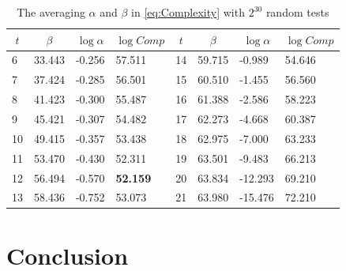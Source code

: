 \begin{table}[htbp]
  \centering
  \caption{The averaging $\alpha$ and $\beta$ in \eqref{eq:Complexity} with $2^{30}$ random tests}\label{tab:ZhangAlphaAndBetaOriginal}
    \begin{tabular}{|l|l|l|l|l|l|l|l|}
    \hline
    \multicolumn{1}{|c|}{$t$} & \multicolumn{1}{c|}{$\beta$} & \multicolumn{1}{c|}{$\log\alpha$} & \multicolumn{1}{c|}{$\log Comp$} & \multicolumn{1}{c|}{$t$} & \multicolumn{1}{c|}{$\beta$} & \multicolumn{1}{c|}{$\log\alpha$} & \multicolumn{1}{c|}{$\log Comp$} \\
    \hline

    6    & 33.443 & -0.256 & 57.511 & 14    & 59.715 & -0.989 &  54.646\\
    \hline
    7    & 37.424 & -0.285 & 56.501 & 15    & 60.510 & -1.455 &  56.560\\
    \hline
    8    & 41.423 & -0.300 & 55.487 & 16    & 61.388 & -2.586 &  58.223\\
    \hline
    9    & 45.421  & -0.307 & 54.482 & 17    & 62.273 & -4.668 &  60.387\\
    \hline
    10   & 49.415 & -0.357  & 53.438 & 18    & 62.975 & -7.000 &  63.233\\
    \hline
    11    & 53.470 & -0.430 & 52.311 & 19    & 63.501 & -9.483 &  66.213\\
    \hline
    12    & 56.494 & -0.570 & \textbf{52.159} & 20    & 63.834 & -12.293 &  69.210\\
    \hline
    13    & 58.436 & -0.752 & 53.073 & 21    & 63.980 & -15.476 &  72.210\\
    \hline
    \end{tabular}%
\end{table}%



\section{Conclusion}





\ifLNCSVER
  
\else
  
\fi





\ifLNCSVER

\else

\fi





